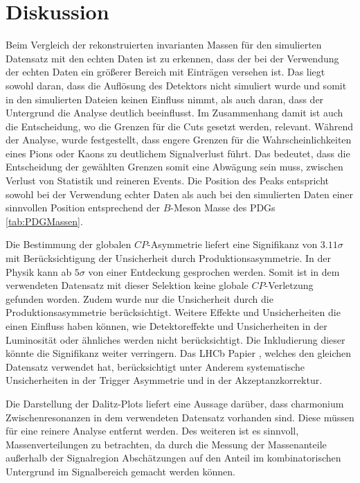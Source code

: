 \section{Diskussion}
\label{sec:discussion}

Beim Vergleich der rekonstruierten invarianten Massen für den simulierten Datensatz
mit den echten Daten ist zu erkennen, dass der bei der Verwendung der echten Daten
ein größerer Bereich mit Einträgen versehen ist. Das liegt sowohl daran, dass die Auflösung des Detektors 
nicht simuliert wurde und somit in den simulierten Dateien keinen Einfluss nimmt, als auch daran, dass der Untergrund
die Analyse deutlich beeinflusst. Im Zusammenhang damit ist auch die Entscheidung, wo
die Grenzen für die Cuts gesetzt werden, relevant. Während der Analyse, wurde
festgestellt, dass engere Grenzen für die Wahrscheinlichkeiten eines Pions oder
Kaons zu deutlichem Signalverlust führt. Das bedeutet, dass die Entscheidung der
gewählten Grenzen somit eine Abwägung sein muss, zwischen Verlust von Statistik
und reineren Events. Die Position des Peaks entspricht sowohl bei der Verwendung
echter Daten als auch bei den simulierten Daten einer sinnvollen Position entsprechend
der $B$-Meson Masse des PDGs \ref{tab:PDGMassen}. \par

Die Bestimmung der globalen $CP$-Asymmetrie liefert eine Signifikanz von
$3.11\sigma$ mit Berücksichtigung der Unsicherheit durch
Produktionsasymmetrie. In der Physik kann ab $5\sigma$ von einer Entdeckung
gesprochen werden. Somit ist in dem verwendeten Datensatz mit dieser
Selektion keine globale $CP$-Verletzung gefunden worden. Zudem wurde nur die
Unsicherheit durch die Produktionsasymmetrie berücksichtigt. Weitere Effekte
und Unsicherheiten die einen Einfluss haben können, wie Detektoreffekte und
Unsicherheiten in der Luminosität oder ähnliches werden nicht berücksichtigt.
Die Inkludierung dieser könnte die Signifikanz weiter verringern. Das LHCb
Papier \cite{paper}, welches den gleichen Datensatz verwendet hat, berücksichtigt
unter Anderem systematische Unsicherheiten in der Trigger Asymmetrie und
in der Akzeptanzkorrektur. \par

Die Darstellung der Dalitz-Plots liefert eine Aussage darüber, dass charmonium
Zwischenresonanzen in dem verwendeten Datensatz vorhanden sind. Diese müssen
für eine reinere Analyse entfernt werden. Des weiteren ist es sinnvoll,
Massenverteilungen zu betrachten, da durch die Messung der Massenanteile
außerhalb der Signalregion Abschätzungen auf den Anteil im kombinatorischen
Untergrund im Signalbereich gemacht werden können.\par

